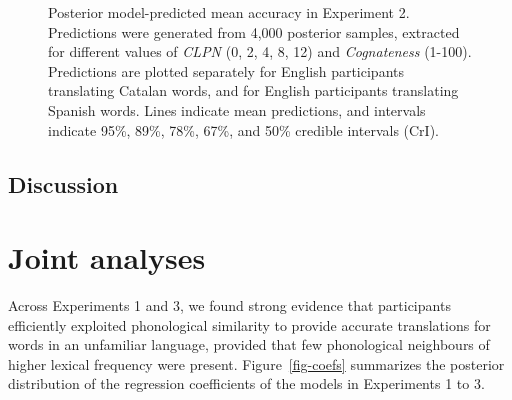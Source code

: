 \documentclass[
]{article}
\begin{document}
\begin{figure}


\caption{\label{fig-epreds-3}Posterior model-predicted mean accuracy in
Experiment 2. Predictions were generated from 4,000 posterior samples,
extracted for different values of \emph{CLPN} (0, 2, 4, 8, 12) and
\emph{Cognateness} (1-100). Predictions are plotted separately for
English participants translating Catalan words, and for English
participants translating Spanish words. Lines indicate mean predictions,
and intervals indicate 95\%, 89\%, 78\%, 67\%, and 50\% credible
intervals (CrI).}

\end{figure}%

\subsection{Discussion}\label{discussion-2}

\section{Joint analyses}\label{joint-analyses}

Across Experiments 1 and 3, we found strong evidence that participants
efficiently exploited phonological similarity to provide accurate
translations for words in an unfamiliar language, provided that few
phonological neighbours of higher lexical frequency were present.
Figure~\ref{fig-coefs} summarizes the posterior distribution of the
regression coefficients of the models in Experiments 1 to 3.
\end{document}
